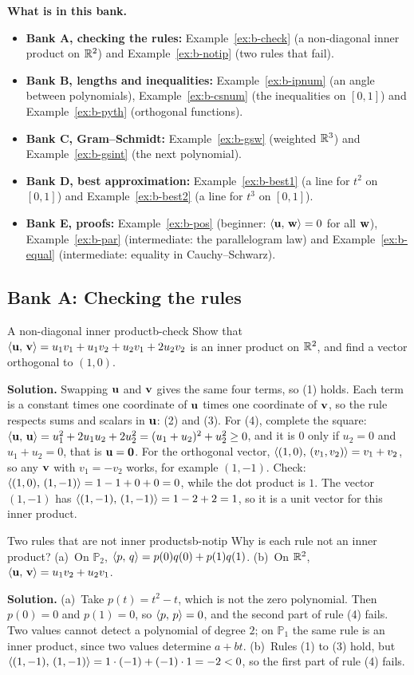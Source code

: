 \documentclass[11pt]{article}
\begin{document}
\textbf{What is in this bank.}
\begin{itemize}
  \item \textbf{Bank A, checking the rules:} Example~\ref{ex:b-check} (a non-diagonal inner product on $\mathbb{R}^2$) and Example~\ref{ex:b-notip} (two rules that fail).
  \item \textbf{Bank B, lengths and inequalities:} Example~\ref{ex:b-ipnum} (an angle between polynomials), Example~\ref{ex:b-csnum} (the inequalities on $[0,1]$) and Example~\ref{ex:b-pyth} (orthogonal functions).
  \item \textbf{Bank C, Gram--Schmidt:} Example~\ref{ex:b-gsw} (weighted $\mathbb{R}^3$) and Example~\ref{ex:b-gsint} (the next polynomial).
  \item \textbf{Bank D, best approximation:} Example~\ref{ex:b-best1} (a line for $t^2$ on $[0,1]$) and Example~\ref{ex:b-best2} (a line for $t^3$ on $[0,1]$).
  \item \textbf{Bank E, proofs:} Example~\ref{ex:b-pos} (beginner: $\langle \mathbf{u},\,\mathbf{w}\rangle=0$ for all $\mathbf{w}$), Example~\ref{ex:b-par} (intermediate: the parallelogram law) and Example~\ref{ex:b-equal} (intermediate: equality in Cauchy--Schwarz).
\end{itemize}

\subsection*{Bank A: Checking the rules}
\begin{exmp}{A non-diagonal inner product}{b-check}
Show that $\langle \mathbf{u},\,\mathbf{v}\rangle=u_1v_1+u_1v_2+u_2v_1+2u_2v_2$ is an inner product on $\mathbb{R}^2$, and find a vector orthogonal to $(1,0)$.

\textbf{Solution.} Swapping $\mathbf{u}$ and $\mathbf{v}$ gives the same four terms, so (1) holds. Each term is a constant times one coordinate of $\mathbf{u}$ times one coordinate of $\mathbf{v}$, so the rule respects sums and scalars in $\mathbf{u}$: (2) and (3). For (4), complete the square: $\langle \mathbf{u},\,\mathbf{u}\rangle=u_1^2+2u_1u_2+2u_2^2=(u_1+u_2)^2+u_2^2\ge0$, and it is $0$ only if $u_2=0$ and $u_1+u_2=0$, that is $\mathbf{u}=\mathbf{0}$. For the orthogonal vector, $\langle (1,0),\,(v_1,v_2)\rangle=v_1+v_2$, so any $\mathbf{v}$ with $v_1=-v_2$ works, for example $(1,-1)$. Check: $\langle (1,0),\,(1,-1)\rangle=1-1+0+0=0$, while the dot product is $1$. The vector $(1,-1)$ has $\langle (1,-1),\,(1,-1)\rangle=1-2+2=1$, so it is a unit vector for this inner product.
\end{exmp}

\begin{exmp}{Two rules that are not inner products}{b-notip}
Why is each rule not an inner product? (a)~On $\mathbb{P}_2$, $\langle p,\,q\rangle=p(0)q(0)+p(1)q(1)$. (b)~On $\mathbb{R}^2$, $\langle \mathbf{u},\,\mathbf{v}\rangle=u_1v_2+u_2v_1$.

\textbf{Solution.} (a)~Take $p(t)=t^2-t$, which is not the zero polynomial. Then $p(0)=0$ and $p(1)=0$, so $\langle p,\,p\rangle=0$, and the second part of rule (4) fails. Two values cannot detect a polynomial of degree $2$; on $\mathbb{P}_1$ the same rule is an inner product, since two values determine $a+bt$. (b)~Rules (1) to (3) hold, but $\langle (1,-1),\,(1,-1)\rangle=1\cdot(-1)+(-1)\cdot1=-2<0$, so the first part of rule (4) fails.
\end{exmp}
\end{document}
